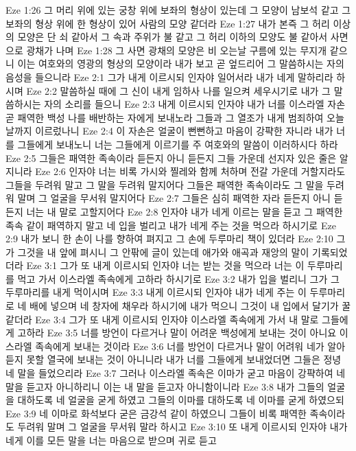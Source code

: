 Eze 1:26  그 머리 위에 있는 궁창 위에 보좌의 형상이 있는데 그 모양이 남보석 같고 그 보좌의 형상 위에 한 형상이 있어 사람의 모양 같더라
Eze 1:27  내가 본즉 그 허리 이상의 모양은 단 쇠 같아서 그 속과 주위가 불 같고 그 허리 이하의 모양도 불 같아서 사면으로 광채가 나며
Eze 1:28  그 사면 광채의 모양은 비 오는날 구름에 있는 무지개 같으니 이는 여호와의 영광의 형상의 모양이라 내가 보고 곧 엎드리어 그 말씀하시는 자의 음성을 들으니라
Eze 2:1  그가 내게 이르시되 인자야 일어서라 내가 네게 말하리라 하시며
Eze 2:2  말씀하실 때에 그 신이 내게 임하사 나를 일으켜 세우시기로 내가 그 말씀하시는 자의 소리를 들으니
Eze 2:3  내게 이르시되 인자야 내가 너를 이스라엘 자손 곧 패역한 백성 나를 배반하는 자에게 보내노라 그들과 그 열조가 내게 범죄하여 오늘날까지 이르렀나니
Eze 2:4  이 자손은 얼굴이 뻔뻔하고 마음이 강퍅한 자니라 내가 너를 그들에게 보내노니 너는 그들에게 이르기를 주 여호와의 말씀이 이러하시다 하라
Eze 2:5  그들은 패역한 족속이라 듣든지 아니 듣든지 그들 가운데 선지자 있은 줄은 알지니라
Eze 2:6  인자야 너는 비록 가시와 찔레와 함께 처하며 전갈 가운데 거할지라도 그들을 두려워 말고 그 말을 두려워 말지어다 그들은 패역한 족속이라도 그 말을 두려워 말며 그 얼굴을 무서워 말지어다
Eze 2:7  그들은 심히 패역한 자라 듣든지 아니 듣든지 너는 내 말로 고할지어다
Eze 2:8  인자야 내가 네게 이르는 말을 듣고 그 패역한 족속 같이 패역하지 말고 네 입을 벌리고 내가 네게 주는 것을 먹으라 하시기로
Eze 2:9  내가 보니 한 손이 나를 향하여 펴지고 그 손에 두루마리 책이 있더라
Eze 2:10  그가 그것을 내 앞에 펴시니 그 안팎에 글이 있는데 애가와 애곡과 재앙의 말이 기록되었더라
Eze 3:1  그가 또 내게 이르시되 인자야 너는 받는 것을 먹으라 너는 이 두루마리를 먹고 가서 이스라엘 족속에게 고하라 하시기로
Eze 3:2  내가 입을 벌리니 그가 그 두루마리를 내게 먹이시며
Eze 3:3  내게 이르시되 인자야 내가 네게 주는 이 두루마리로 네 배에 넣으며 네 창자에 채우라 하시기에 내가 먹으니 그것이 내 입에서 달기가 꿀 같더라
Eze 3:4  그가 또 내게 이르시되 인자야 이스라엘 족속에게 가서 내 말로 그들에게 고하라
Eze 3:5  너를 방언이 다르거나 말이 어려운 백성에게 보내는 것이 아니요 이스라엘 족속에게 보내는 것이라
Eze 3:6  너를 방언이 다르거나 말이 어려워 네가 알아듣지 못할 열국에 보내는 것이 아니니라 내가 너를 그들에게 보내었더면 그들은 정녕 네 말을 들었으리라
Eze 3:7  그러나 이스라엘 족속은 이마가 굳고 마음이 강퍅하여 네 말을 듣고자 아니하리니 이는 내 말을 듣고자 아니함이니라
Eze 3:8  내가 그들의 얼굴을 대하도록 네 얼굴을 굳게 하였고 그들의 이마를 대하도록 네 이마를 굳게 하였으되
Eze 3:9  네 이마로 화석보다 굳은 금강석 같이 하였으니 그들이 비록 패역한 족속이라도 두려워 말며 그 얼굴을 무서워 말라 하시고
Eze 3:10  또 내게 이르시되 인자야 내가 네게 이를 모든 말을 너는 마음으로 받으며 귀로 듣고
